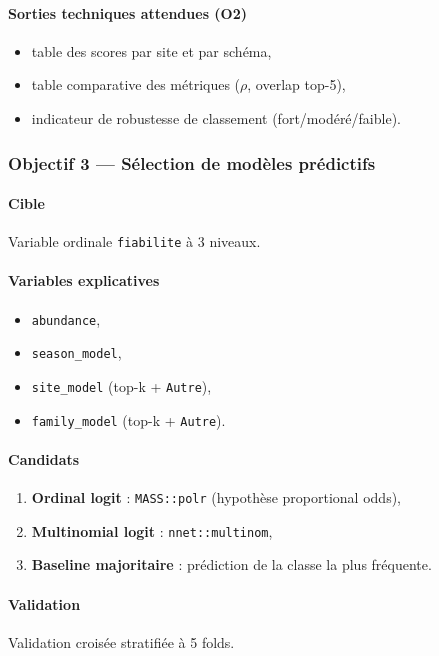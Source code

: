\documentclass[11pt,a4paper]{article}
\begin{document}
\paragraph{Sorties techniques attendues (O2)}
\begin{itemize}[leftmargin=1.2cm]
  \item table des scores par site et par sch\'ema,
  \item table comparative des m\'etriques ($\rho$, overlap top-5),
  \item indicateur de robustesse de classement (fort/mod\'er\'e/faible).
\end{itemize}

\subsubsection{Objectif 3 --- S\'election de modèles pr\'edictifs}
\paragraph{Cible}
Variable ordinale \texttt{fiabilite} à 3 niveaux.

\paragraph{Variables explicatives}
\begin{itemize}[leftmargin=1.2cm]
  \item \texttt{abundance},
  \item \texttt{season\_model},
  \item \texttt{site\_model} (top-k + \texttt{Autre}),
  \item \texttt{family\_model} (top-k + \texttt{Autre}).
\end{itemize}

\paragraph{Candidats}
\begin{enumerate}[leftmargin=1.2cm]
  \item \textbf{Ordinal logit} : \texttt{MASS::polr} (hypothèse proportional odds),
  \item \textbf{Multinomial logit} : \texttt{nnet::multinom},
  \item \textbf{Baseline majoritaire} : pr\'ediction de la classe la plus fr\'equente.
\end{enumerate}

\paragraph{Validation}
Validation crois\'ee stratifi\'ee à 5 folds.
\end{document}

